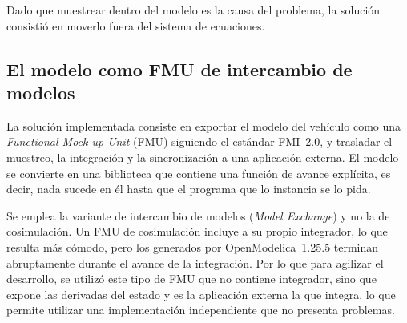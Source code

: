 
Dado que muestrear dentro del modelo es la causa del problema, la solución consistió en moverlo fuera del sistema de ecuaciones.





\subsection{El modelo como FMU de intercambio de modelos}

La solución implementada consiste en exportar el modelo del vehículo como una \textit{Functional Mock-up Unit} (FMU) siguiendo el estándar FMI~2.0, y trasladar el muestreo, la integración y la sincronización a una aplicación externa. El modelo se convierte en una biblioteca que contiene una función de avance explícita, es decir, nada sucede en él hasta que el programa que lo instancia se lo pida.

Se emplea la variante de intercambio de modelos (\textit{Model Exchange}) y no la de cosimulación. Un FMU de cosimulación incluye a su propio integrador, lo que resulta más cómodo, pero los generados por  OpenModelica~1.25.5 terminan abruptamente durante el avance de la integración. Por lo que para agilizar el desarrollo, se utilizó este tipo de FMU que no contiene integrador, sino que expone las derivadas del estado y es la aplicación externa la que integra, lo que permite utilizar una implementación independiente que no presenta problemas.

